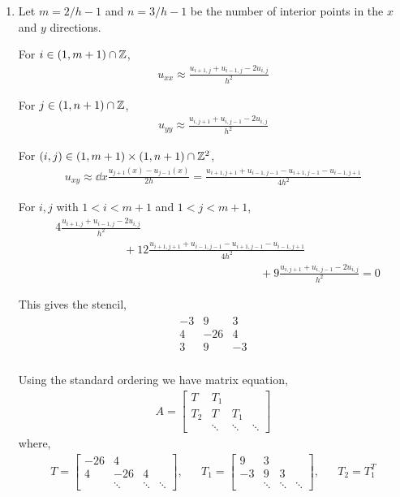 \documentclass[10pt]{article}
\begin{document}
\begin{solution}[Solution]
\begin{enumerate}[]
\item Let \( m = 2/h-1 \) and \( n = 3/h-1 \) be the number of interior points in the \( x \) and \( y \) directions.

For \( i \in (1,m+1)\cap \mathbb{Z} \),
\begin{align*}
    u_{xx} \approx \frac{u_{i+1,j}+u_{i-1,j}-2u_{i,j}}{h^2}
\end{align*}

For \( j\in(1,n+1)\cap\mathbb{Z} \),
\begin{align*}
    u_{yy} \approx \frac{u_{i,j+1}+u_{i,j-1}-2u_{i,j}}{h^2}
\end{align*}

For \( (i,j)\in(1,m+1)\times(1,n+1)\cap\mathbb{Z}^2 \),
\begin{align*}
    u_{xy} \approx \dd{}{x} \frac{u_{j+1}(x) - u_{j-1}(x) }{2h} = \frac{u_{i+1,j+1} + u_{i-1,j-1} - u_{i+1,j-1} - u_{i-1,j+1}}{4h^2}
\end{align*}

For \( i,j \) with \( 1<i<m+1 \) and \( 1<j<m+1 \),
\begin{align*}
    &4\frac{u_{i+1,j}+u_{i-1,j}-2u_{i,j}}{h^2} \\
    & \hspace{6em}+ 12 \frac{u_{i+1,j+1} + u_{i-1,j-1} - u_{i+1,j-1} - u_{i-1,j+1}}{4h^2} \\
    & \hspace{18em}  + 9 \frac{u_{i,j+1}+u_{i,j-1}-2u_{i,j}}{h^2} = 0
\end{align*}

This gives the stencil,
\begin{align*}
\begin{array}{ccc}
-3 & 9 & 3 \\
4 & -26 & 4 \\
3 & 9 & -3 \\
\end{array}
\end{align*}

Using the standard ordering we have matrix equation,
\begin{align*}
    A = \left[\begin{array}{cccc}T & T_1
    \\ T_2 & T & T_1
    \\ & \ddots & \ddots & \ddots
    \end{array}\right]
\end{align*}
where,
\begin{align*}
T = \left[\begin{array}{cccc}
-26 & 4 \\
4 & -26 & 4 \\
& \ddots & \ddots & \ddots
\end{array}\right],&&
T_1 = \left[\begin{array}{cccc}
9 & 3 \\
-3 & 9 & 3 \\
& \ddots & \ddots & \ddots
\end{array}\right],&&
T_2 = T_1^T
\end{align*}


\end{enumerate}
\end{solution}
\end{document}
